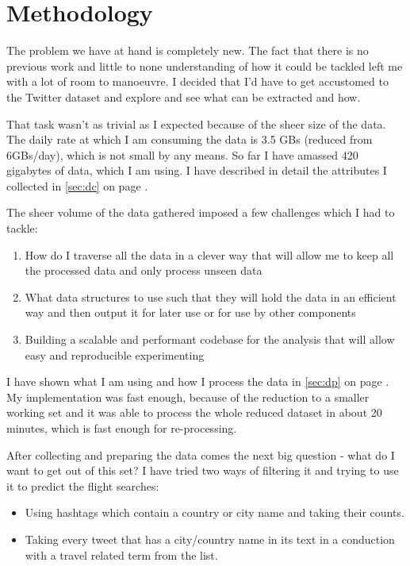 \documentclass[minf,frontabs,twoside,singlespacing,parskip]{infthesis}
\begin{document}
\chapter{Methodology}
\label{chap:method}

The problem we have at hand is completely new. The fact that there is no previous work and little to none understanding of how it could be tackled left me with a lot of room to manoeuvre. I decided that I'd have to get accustomed to the Twitter dataset and explore and see what can be extracted and how. 


That task wasn't as trivial as I expected because of the sheer size of the data. The daily rate at which I am consuming the data is 3.5 GBs (reduced from 6GBs/day), which is not small by any means. So far I have amassed 420 gigabytes of data, which I am using. I have described in detail the attributes I collected in \ref{sec:dc} on page \pageref{sec:dc}. 


The sheer volume of the data gathered imposed a few challenges which I had to tackle:
\begin{enumerate}
\item How do I traverse all the data in a clever way that will allow me to keep all the processed data and only process unseen data
\item What data structures to use such that they will hold the data in an efficient way and then output it for later use or for use by other components
\item Building a scalable and performant codebase for the analysis that will allow easy and reproducible experimenting
\end{enumerate}

I have shown what I am using and how I process the data in \ref{sec:dp} on page \pageref{sec:dp}. My implementation was fast enough, because of the reduction to a smaller working set and it was able to process the whole reduced dataset in about 20 minutes, which is fast enough for re-processing.

After collecting and preparing the data comes the next big question - what do I want to get out of this set? I have tried two ways of filtering it and trying to use it to predict the flight searches:
\begin{itemize}
\item Using hashtags which contain a country or city name and taking their counts.
\item Taking every tweet that has a city/country name in its text in a conduction with a travel related term from the list. 
\end{itemize}
\end{document}
